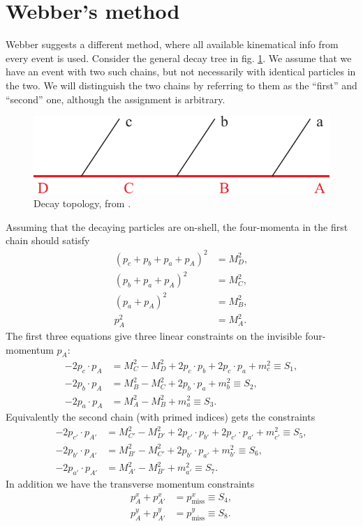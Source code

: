 \documentclass[twoside,english]{uiofysmaster}
\begin{document}
\section{Webber's method}
Webber \cite{Webber:2009vm} suggests a different method, where all available kinematical info from every event is used. Consider the general decay tree in fig. \ref{fig:decaytree}. We assume that we have an event with two such chains, but not necessarily with identical particles in the two. We will distinguish the two chains by referring to them as the ``first'' and ``second'' one, although the assignment is arbitrary.
\begin{figure}[hbt]
\centering
\includegraphics[scale=0.7]{figures/fig-chain.pdf} %
\caption{Decay topology, from \cite{Miller:2005zp}.}
\label{fig:decaytree}
\end{figure}
Assuming that the decaying particles are on-shell, the four-momenta in the first chain should satisfy
\begin{align}
	(p_c + p_b + p_a + p_A)^2 &= M_D^2,\nonumber \\
	(p_b + p_a + p_A)^2 &= M_C^2,\nonumber \\
	(p_a + p_A)^2 &= M_B^2,\label{eq:constraints}\\
	p_A^2 &= M_A^2.\nonumber
\end{align}
The first three equations give three linear constraints on the invisible four-momentum $p_A$:
\begin{align}
	-2p_c\cdot p_A &= M_C^2 - M_D^2 + 2p_c\cdot p_b + 2p_c \cdot p_a + m_c^2 \equiv S_1,\nonumber \\
	-2p_b\cdot p_A &= M_B^2 - M_C^2 + 2p_b\cdot p_a + m_b^2 \equiv S_2,\\
	-2p_a\cdot p_A &= M_A^2 - M_B^2 + m_a^2 \equiv S_3. \nonumber
\end{align}
Equivalently the second chain (with primed indices) gets the constraints
\begin{align}
	-2p_{c'}\cdot p_{A'} &= M_{C'}^2 - M_{D'}^2 + 2p_{c'}\cdot p_{b'} + 2p_{c'} \cdot p_{a'} + m_{c'}^2 \equiv S_5,\nonumber \\ 
	-2p_{b'}\cdot p_{A'} &= M_{B'}^2 - M_{C'}^2 + 2p_{b'}\cdot p_{a'} + m_{b'}^2 \equiv S_6,\\
	-2p_{a'}\cdot p_{A'} &= M_{A'}^2 - M_{B'}^2 + m_{a'}^2 \equiv S_7.\nonumber
\end{align}
In addition we have the transverse momentum constraints
\begin{align}
	p_A^x + p_{A'}^x &= p_\mathrm{miss}^x \equiv S_4, \label{eq:Svec_orig} \\
	p_A^y + p_{A'}^y &= p_\mathrm{miss}^y \equiv S_8. \nonumber
\end{align}
\end{document}
